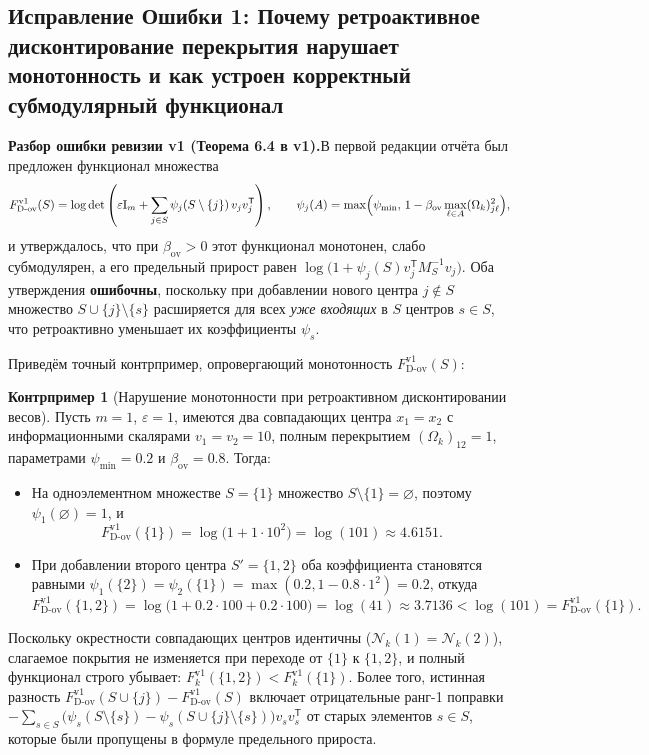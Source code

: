 \documentclass[11pt,a4paper]{article}
\newcommand{\Id}{\mathrm{I}}
\newcommand{\T}{^{\mathsf{T}}}
\theoremstyle{definition}
\newtheorem{counterexample}[theorem]{Контрпример}
\theoremstyle{remark}
\newcommand{\auditbox}[2]{%
  \vspace{6pt}\noindent\colorbox{warnbg}{%
    \parbox{\dimexpr\textwidth-2\fboxsep\relax}{%
      \vspace{4pt}\textbf{\color{accent}#1.}\hspace{0.4em}#2\vspace{4pt}%
    }%
  }\vspace{6pt}%
}
\begin{document}
\subsection{Исправление Ошибки 1: Почему ретроактивное дисконтирование перекрытия нарушает монотонность и как устроен корректный субмодулярный функционал}

\auditbox{Разбор ошибки ревизии v1 (Теорема 6.4 в v1)}{В первой редакции отчёта был предложен функционал множества
\[
    F_{\mathrm{D\text{-}ov}}^{\mathrm{v1}}(S) = \log\det\left(\varepsilon \Id_m + \sum_{j \in S} \psi_j(S \setminus \{j\}) \, v_j v_j\T\right), \qquad \psi_j(A) = \max\Bigl(\psi_{\min}, \, 1 - \beta_{\mathrm{ov}} \max_{\ell \in A} (\Omega_k)_{j\ell}^2\Bigr),
\]
и утверждалось, что при $\beta_{\mathrm{ov}} > 0$ этот функционал монотонен, слабо субмодулярен, а его предельный прирост равен $\log\bigl(1 + \psi_j(S) v_j\T M_S^{-1} v_j\bigr)$. Оба утверждения \textbf{ошибочны}, поскольку при добавлении нового центра $j \notin S$ множество $S \cup \{j\} \setminus \{s\}$ расширяется для всех \emph{уже входящих} в $S$ центров $s \in S$, что ретроактивно уменьшает их коэффициенты $\psi_s$.}

Приведём точный контрпример, опровергающий монотонность $F_{\mathrm{D\text{-}ov}}^{\mathrm{v1}}(S)$:

\begin{counterexample}[Нарушение монотонности при ретроактивном дисконтировании весов]\label{cex:retro_discount}
Пусть $m = 1$, $\varepsilon = 1$, имеются два совпадающих центра $x_1 = x_2$ с информационными скалярами $v_1 = v_2 = 10$, полным перекрытием $(\Omega_k)_{12} = 1$, параметрами $\psi_{\min} = 0.2$ и $\beta_{\mathrm{ov}} = 0.8$. Тогда:
\begin{itemize}
    \item На одноэлементном множестве $S = \{1\}$ множество $S \setminus \{1\} = \varnothing$, поэтому $\psi_1(\varnothing) = 1$, и
    \[
        F_{\mathrm{D\text{-}ov}}^{\mathrm{v1}}(\{1\}) = \log\bigl(1 + 1 \cdot 10^2\bigr) = \log(101) \approx 4.6151.
    \]
    \item При добавлении второго центра $S' = \{1, 2\}$ оба коэффициента становятся равными $\psi_1(\{2\}) = \psi_2(\{1\}) = \max(0.2, 1 - 0.8 \cdot 1^2) = 0.2$, откуда
    \[
        F_{\mathrm{D\text{-}ov}}^{\mathrm{v1}}(\{1, 2\}) = \log\bigl(1 + 0.2 \cdot 100 + 0.2 \cdot 100\bigr) = \log(41) \approx 3.7136 < \log(101) = F_{\mathrm{D\text{-}ov}}^{\mathrm{v1}}(\{1\}).
    \]
\end{itemize}
Поскольку окрестности совпадающих центров идентичны ($\mathcal{N}_k(1) = \mathcal{N}_k(2)$), слагаемое покрытия не изменяется при переходе от $\{1\}$ к $\{1,2\}$, и полный функционал строго убывает: $F_k^{\mathrm{v1}}(\{1,2\}) < F_k^{\mathrm{v1}}(\{1\})$. Более того, истинная разность $F_{\mathrm{D\text{-}ov}}^{\mathrm{v1}}(S \cup \{j\}) - F_{\mathrm{D\text{-}ov}}^{\mathrm{v1}}(S)$ включает отрицательные ранг-1 поправки $-\sum_{s \in S}\bigl(\psi_s(S\setminus\{s\}) - \psi_s(S\cup\{j\}\setminus\{s\})\bigr)v_s v_s\T$ от старых элементов $s \in S$, которые были пропущены в формуле предельного прироста.
\end{counterexample}
\end{document}
